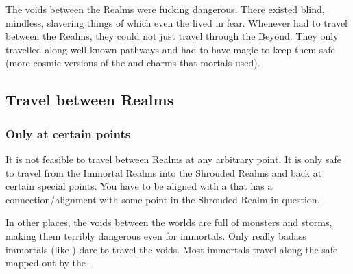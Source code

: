 The voids between the Realms were fucking dangerous. 
There existed blind, mindless, slavering things of which even the \resphain lived in fear. 
Whenever \resphain had to travel between the Realms, they could not just travel through the Beyond.
They only travelled along well-known pathways and had to have magic to keep them safe (more cosmic versions of the \eidola and \wylde charms that mortals used).









\subsection{Travel between Realms}





\subsubsection{Only at certain points}
It is not feasible to travel between Realms at any arbitrary point. 
It is only safe to travel from the Immortal Realms into the Shrouded Realms and back at certain special points. 
You have to be aligned with a \matrix{} that has a connection/alignment with some \nexus{} point in the Shrouded Realm in question. 

In other places, the voids between the worlds are full of monsters and storms, making them terribly dangerous even for immortals. 
Only really badass immortals (like \QuessanthIshnaruchaefir) dare to travel the voids. 
Most immortals travel along the safe  mapped out by the \matrices. 






